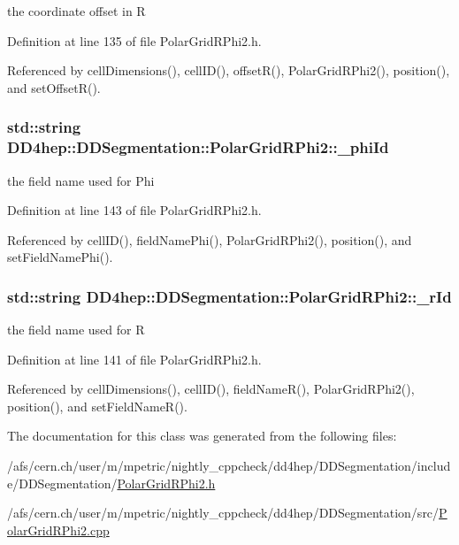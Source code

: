 the coordinate offset in R 

Definition at line 135 of file PolarGridRPhi2.h.

Referenced by cellDimensions(), cellID(), offsetR(), PolarGridRPhi2(), position(), and setOffsetR().\hypertarget{class_d_d4hep_1_1_d_d_segmentation_1_1_polar_grid_r_phi2_a95332f186af59bd325277868ffeb3ea6}{
\subsubsection[{\_\-phiId}]{\setlength{\rightskip}{0pt plus 5cm}std::string {\bf DD4hep::DDSegmentation::PolarGridRPhi2::\_\-phiId}}}
\label{class_d_d4hep_1_1_d_d_segmentation_1_1_polar_grid_r_phi2_a95332f186af59bd325277868ffeb3ea6}


the field name used for Phi 

Definition at line 143 of file PolarGridRPhi2.h.

Referenced by cellID(), fieldNamePhi(), PolarGridRPhi2(), position(), and setFieldNamePhi().\hypertarget{class_d_d4hep_1_1_d_d_segmentation_1_1_polar_grid_r_phi2_a93baa19a86e2412bf85fe2749c9d2bb4}{
\subsubsection[{\_\-rId}]{\setlength{\rightskip}{0pt plus 5cm}std::string {\bf DD4hep::DDSegmentation::PolarGridRPhi2::\_\-rId}}}
\label{class_d_d4hep_1_1_d_d_segmentation_1_1_polar_grid_r_phi2_a93baa19a86e2412bf85fe2749c9d2bb4}


the field name used for R 

Definition at line 141 of file PolarGridRPhi2.h.

Referenced by cellDimensions(), cellID(), fieldNameR(), PolarGridRPhi2(), position(), and setFieldNameR().

The documentation for this class was generated from the following files:\begin{DoxyCompactItemize}
\item 
/afs/cern.ch/user/m/mpetric/nightly\_\-cppcheck/dd4hep/DDSegmentation/include/DDSegmentation/\hyperlink{_d_d_segmentation_2include_2_d_d_segmentation_2_polar_grid_r_phi2_8h}{PolarGridRPhi2.h}\item 
/afs/cern.ch/user/m/mpetric/nightly\_\-cppcheck/dd4hep/DDSegmentation/src/\hyperlink{_d_d_segmentation_2src_2_polar_grid_r_phi2_8cpp}{PolarGridRPhi2.cpp}\end{DoxyCompactItemize}
